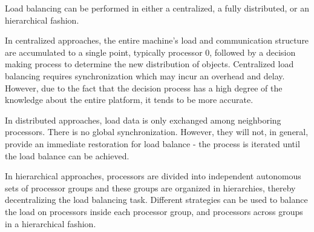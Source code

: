 Load balancing can be performed in either a centralized, a fully distributed,
or an hierarchical fashion.

In centralized approaches, the entire machine's load and communication
structure are accumulated to a single point, typically processor 0, followed by
a decision making process to determine the new distribution of \charmpp
objects. Centralized load balancing requires synchronization which may incur an
overhead and delay. However, due to the fact that the decision process has a
high degree of the knowledge about the entire platform, it tends to be more
accurate.

In distributed approaches, load data is only exchanged among 
neighboring processors. There is no global synchronization. However,
they will not, in general, provide an immediate restoration for load balance -
the process is iterated until the load balance can be achieved.

In hierarchical approaches, processors are divided into independent autonomous
sets of processor groups and these groups are organized in hierarchies,
thereby decentralizing the load balancing task. Different strategies can be
used to balance the load on processors inside each processor group, and
processors across groups in a hierarchical fashion.

